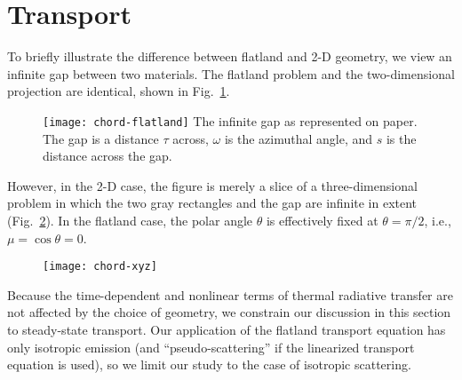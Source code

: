 \clearpage
\section{Transport}

To briefly illustrate the difference between flatland and 2-D geometry, we
view an infinite gap between two materials. The flatland problem and the
two-dimensional projection are identical, shown in Fig.~\ref{fig:chordFlatland}.
%
\begin{figure}[htb]
  \centering
  \texttt{[image: chord-flatland]}
  {The infinite gap as represented on paper. The gap is a distance
  $\tau$ across, $\omega$ is the azimuthal angle, and $s$ is the
  distance across the gap.}
  \label{fig:chordFlatland}
\end{figure}
%
However, in the 2-D case, the figure is merely a slice of a three-dimensional
problem in which the two gray rectangles and the gap are infinite in extent
(Fig.~\ref{fig:chordXy}). In the flatland case, the polar angle $\theta$ is
effectively fixed at $\theta=\pi/2$, i.e., $\mu=\cos\theta = 0$.
%
\begin{figure}[htb]
  \centering
  \texttt{[image: chord-xyz]}
  \label{fig:chordXy}
\end{figure}

Because the time-dependent and nonlinear terms of thermal radiative transfer are
not affected by the choice of geometry, we constrain our discussion in this
section to steady-state transport. Our application of the flatland
transport equation
has only isotropic emission (and ``pseudo-scattering'' if the linearized
transport equation is used), so we limit our study to the case of isotropic
scattering.

